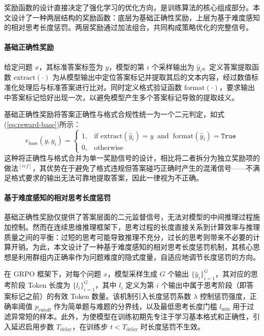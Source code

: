 奖励函数的设计直接决定了强化学习的优化方向，是训练算法的核心组成部分。本文设计了一种两层结构的奖励函数：底层为基础正确性奖励，上层为基于难度感知的相对思考长度惩罚。两层奖励通过加法组合，共同构成策略优化的完整信号。

\paragraph{基础正确性奖励}

给定问题 $x$，其标准答案标签为 $y$，模型的第 $i$ 个采样输出为 $\hat{y}_i$。定义答案提取函数 $\text{extract}(\cdot)$ 为从模型输出中定位答案标记并提取其后的文本内容，经过数值标准化处理后与标准答案进行比对。同时定义格式验证函数 $\text{format}(\cdot)$，要求输出中答案标记恰好出现一次，以避免模型产生多个答案标记导致的提取歧义。

基础正确性奖励将答案正确性与格式合规性统一为一个二元判定，如式(\ref{eq:reward-base})所示：
\begin{equation}\label{eq:reward-base}
  r_{\text{base}}(y, \hat{y}_i) =
  \begin{cases}
    1, & \text{if } \text{extract}(\hat{y}_i) = y \;\;\text{and}\;\; \text{format}(\hat{y}_i) = \texttt{True} \\
    0, & \text{otherwise}
  \end{cases}
\end{equation}
这种将正确性与格式合并为单一奖励信号的设计，相比将二者拆分为独立奖励项的做法$^{[ref]}$，其优势在于避免了格式违规但答案碰巧正确时产生的混淆信号——不满足格式要求的输出无法可靠地提取答案，因此一律视为不正确。

\paragraph{基于难度感知的相对思考长度惩罚}

基础正确性奖励仅提供了答案层面的二元监督信号，无法对模型的中间推理过程施加控制。然而在连续思维推理框架下，思考过程的长度直接关系到计算效率与推理质量之间的平衡：过短的思考可能导致推理不充分，过长的思考则带来不必要的计算开销。为此，本文设计了一种基于难度感知的相对思考长度惩罚机制，其核心思想是利用群组内正确率作为问题难度的隐式度量，自适应地调节长度惩罚的方向。

在 GRPO 框架下，对每个问题 $x$，模型采样生成 $G$ 个输出 $\{\hat{y}_i\}_{i=1}^G$，其对应的思考阶段 Token 长度为 $\{l_i\}_{i=1}^G$，其中 $l_i$ 定义为第 $i$ 个输出中属于思考阶段（即答案标记之前）的有效 Token 数量。该机制引入长度惩罚系数 $\lambda$ 控制惩罚强度，正确率阈值 $p_{\text{cutoff}}$ 作为简单题与难题的分界线，以及最低思考长度门槛 $l_{\min}$ 用于过滤异常短的样本。此外，为使模型在训练初期先专注于学习基本格式和正确性，引入延迟启用步数 $T_{\text{delay}}$，在训练步 $t < T_{\text{delay}}$ 时长度惩罚不生效。

